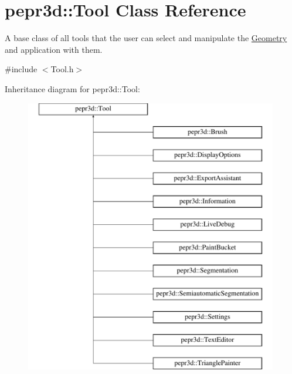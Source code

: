 \hypertarget{classpepr3d_1_1_tool}{}\section{pepr3d\+::Tool Class Reference}
\label{classpepr3d_1_1_tool}


A base class of all tools that the user can select and manipulate the \mbox{\hyperlink{classpepr3d_1_1_geometry}{Geometry}} and application with them.  




{\ttfamily \#include $<$Tool.\+h$>$}

Inheritance diagram for pepr3d\+::Tool\+:\begin{figure}[H]
\begin{center}
\leavevmode
\includegraphics[height=12.000000cm]{classpepr3d_1_1_tool}
\end{center}
\end{figure}
